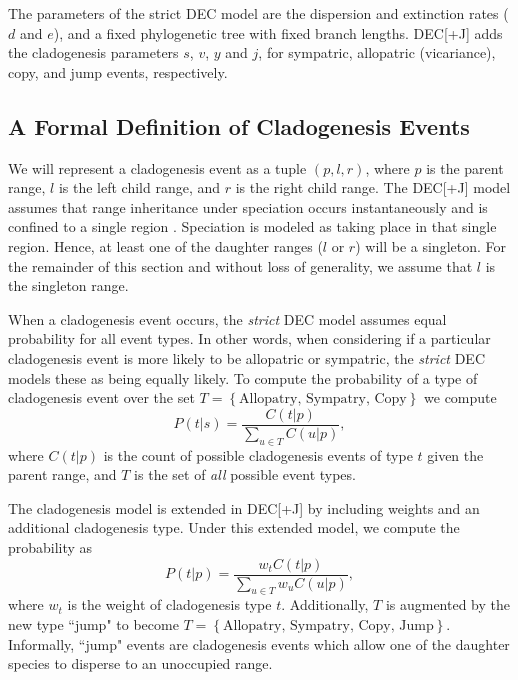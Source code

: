 \documentclass[a4paper]{article}
\newcommand{\decj}{DEC[+J]}
\begin{document}
The parameters of the strict DEC model are the dispersion and extinction rates ($d$ and $e$), and a fixed phylogenetic tree
with fixed branch lengths. 
\decj{} adds the cladogenesis parameters $s$, $v$, $y$ and $j$, for sympatric, allopatric (vicariance), copy, and jump
events, respectively.

\subsection{A Formal Definition of Cladogenesis Events}
\label{sec:formal-cladogenesis}

We will represent a cladogenesis event as a tuple $(p, l, r)$, where $p$ is the parent range, $l$ is the left child
range, and $r$ is the right child range.
The DEC[+J] model assumes that range inheritance under speciation occurs instantaneously and is confined to a single region .
Speciation is modeled as taking place in that single region.
Hence, at least one of the daughter ranges ($l$ or $r$) will be a singleton.
For the remainder of this section and without loss of generality, we assume that $l$ is the singleton range.

When a cladogenesis event occurs, the \textit{strict} DEC model assumes equal probability for all event types.
In other words, when considering if a particular cladogenesis event is more likely to be allopatric or sympatric,
the \textit{strict} DEC models these as being equally likely.
To compute the probability of a type of cladogenesis event over the set \(T = \left\{\text{Allopatry, Sympatry,
Copy}\right\}\) we compute
\[
	P(t |
	s) = \frac{C(t | p)}{\sum_{u \in T} C(u | p)},
\]
where \( C(t|p) \) is the count of possible cladogenesis events of type $t$ given the parent range, and $T$ is
the set of \textit{all} possible event types.

The cladogenesis model is extended in \decj{} by including weights and an additional cladogenesis type.
Under this extended model, we compute the probability as 
\begin{equation}
	P(t | p) = \frac{w_t C(t | p)}{\sum_{u \in T} w_u C(u | p)},
\end{equation}
where $w_t$ is the weight of cladogenesis type $t$.
Additionally, $T$ is augmented by the new type ``jump" to become \(T = \left\{\text{Allopatry, Sympatry, Copy,
Jump}\right\} \).
Informally, ``jump" events are cladogenesis events which allow one of the daughter species to disperse to an unoccupied
range.
\end{document}
